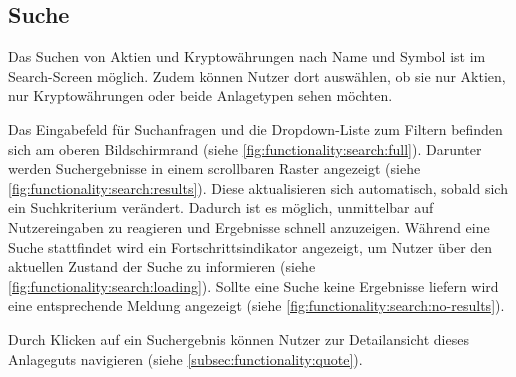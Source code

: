 \documentclass[a4paper]{article}
\begin{document}
\subsection{Suche}
\label{subsec:functionality:search}
Das Suchen von Aktien und Kryptowährungen nach Name und Symbol ist im Search-Screen möglich.
Zudem können Nutzer dort auswählen, ob sie nur Aktien, nur Kryptowährungen oder beide Anlagetypen sehen möchten.

Das Eingabefeld für Suchanfragen und die Dropdown-Liste zum Filtern befinden sich am oberen Bildschirmrand (siehe \autoref{fig:functionality:search:full}).
Darunter werden Suchergebnisse in einem scrollbaren Raster angezeigt (siehe \autoref{fig:functionality:search:results}).
Diese aktualisieren sich automatisch, sobald sich ein Suchkriterium verändert.
Dadurch ist es möglich, unmittelbar auf Nutzereingaben zu reagieren und Ergebnisse schnell anzuzeigen.
Während eine Suche stattfindet wird ein Fortschritts\-indikator angezeigt, um Nutzer über den aktuellen Zustand der Suche zu informieren (siehe \autoref{fig:functionality:search:loading}).
Sollte eine Suche keine Ergebnisse liefern wird eine entsprechende Meldung angezeigt (siehe \autoref{fig:functionality:search:no-results}).

Durch Klicken auf ein Suchergebnis können Nutzer zur Detailansicht dieses Anlageguts navigieren (siehe \autoref{subsec:functionality:quote}).
\end{document}

